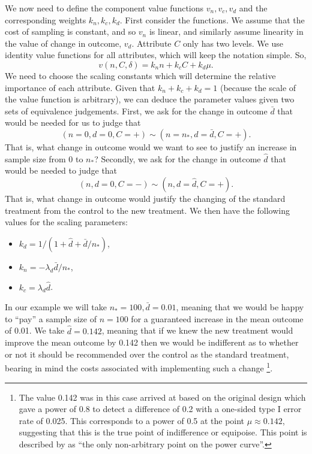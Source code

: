 \documentclass[sagev]{sagej}
\begin{document}
We now need to define the component value functions $v_n, v_c, v_d$ and the corresponding weights $k_n, k_c, k_d$. First consider the functions. We assume that the cost of sampling is constant, and so $v_n$ is linear, and similarly assume linearity in the value of change in outcome, $v_d$. Attribute $C$ only has two levels. We use identity value functions for all attributes, which will keep the notation simple. So,
$$ 
v(n, C, \delta) = k_n n + k_c C + k_d \mu.
$$
We need to choose the scaling constants which will determine the relative importance of each attribute. Given that $k_n + k_c + k_d = 1$ (because the scale of the value function is arbitrary), we can deduce the parameter values given two sets of equivalence judgements. First, we ask for the change in outcome $\bar{d}$ that would be needed for us to judge that
$$
(n = 0, d = 0, C = +) \sim (n = n_*, d = \bar{d}, C = +).
$$
That is, what change in outcome would we want to see to justify an increase in sample size from 0 to $n_*$? Secondly, we ask for the change in outcome $\hat{d}$ that would be needed to judge that
$$
(n, d = 0, C = -) \sim (n, d = \hat{d}, C = +).
$$
That is, what change in outcome would justify the changing of the standard treatment from the control to the new treatment. We then have the following values for the scaling parameters:

\begin{itemize}
\item $k_d = 1/(1 + \hat{d} + \bar{d}/n_*)$,
\item $k_n = -\lambda_d \bar{d}/n_*$,
\item $k_c = \lambda_d \hat{d}$.
\end{itemize}

In our example we will take $n_* = 100, \bar{d} = 0.01$, meaning that we would be happy to ``pay'' a sample size of $n = 100$ for a guaranteed increase in the mean outcome of 0.01. We take $\hat{d} = 0.142$, meaning that if we knew the new treatment would improve the mean outcome by 0.142 then we would be indifferent as to whether or not it should be recommended over the control as the standard treatment, bearing in mind the costs associated with implementing such a change \footnote{The value 0.142 was in this case arrived at based on the original design which gave a power of 0.8 to detect a difference of 0.2 with a one-sided type I error rate of 0.025. This corresponds to a power of 0.5 at the point $\mu \approx 0.142$, suggesting that this is the true point of indifference or equipoise. This point is described by \cite{Willan2005} as ``the only non-arbitrary point on the power curve''.}. 
\end{document}
